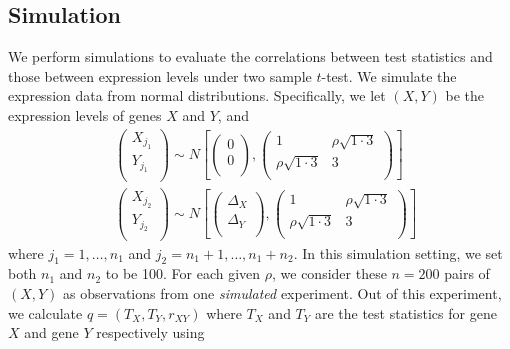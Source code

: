\documentclass[12pt, a4paper]{article}
\begin{document}
	
	
	\subsection{Simulation}
	We perform simulations to evaluate the correlations between test statistics and those between expression levels under two sample $t$-test. We simulate the expression data from normal distributions. Specifically, we let $(X, Y)$ be the expression levels of genes $X$ and $Y$, and
	\begin{equation}
		\begin{aligned}
			&\left( \begin{array}{c}
				X_{j_1}\\
				Y_{j_1}\\
			\end{array}\right)
			\sim N\left[
			\left(\begin{array}{c}
				0\\
				0\\
			\end{array} \right), 
			\left(
			\begin{array}{cc}
				1 &\rho \sqrt{1\cdot 3} \\
				\rho \sqrt{1\cdot 3} & 	3 \\
			\end{array}
			\right)
			\right] \\
			& \left( \begin{array}{c}
				X_{j_2}\\
				Y_{j_2}\\
			\end{array}\right)
			\sim N\left[
			\left(\begin{array}{c}
				\Delta_X\\
				 \Delta_Y\\
			\end{array} \right), 
			\left(
			\begin{array}{cc}
				1 &\rho \sqrt{1\cdot 3} \\
				\rho \sqrt{1\cdot 3} & 	3 \\
			\end{array}
			\right)
			\right] 
		\end{aligned}
	\end{equation}
	where $j_1 = 1,\ldots, n_1$ and $j_2 = n_1 + 1, \ldots, n_1 + n_2$. In this simulation setting, we set both $n_1$ and $n_2$ to be 100.  For each given $\rho$, we consider these $n=200$ pairs of $(X, Y)$
	as observations from one \textit{simulated} experiment. Out of this experiment, we calculate $q = (T_X, T_Y, r_{XY})$ where $T_X$ and $T_Y$ are the test statistics for gene $X$ and gene $Y$ respectively using 
\end{document}
